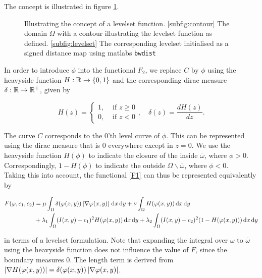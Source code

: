 The concept is illustrated in figure \ref{fig:levelsetconcept}.

\begin{figure}
  \centering
  \quad
  \caption{Illustrating the concept of a levelset function. \ref{subfig:contour} The domain $\Omega$ with a contour illustrating the levelset function as defined. \ref{subfig:levelset} The corresponding levelset initialised as a signed distance map using matlabs \texttt{bwdist}}\label{fig:levelsetconcept}
\end{figure}

In order to introduce $\phi$ into the functional $F_2$, we replace $C$ by $\phi$ using the heavyside function $H:\mathbb R \to \{0,1\}$ and the corresponding dirac measure $\delta:\mathbb R\to \mathbb R^+$, given by

\begin{equation}
  H(z) = \begin{cases}
    1,& \mbox{ if }  z \geq 0\\
    0,& \mbox{ if }  z < 0
  \end{cases}, \quad 
  \delta(z) = \frac{dH(z)}{dz}.
\end{equation}


The curve $C$ corresponds to the 0'th level curve of $\phi$. This can be represented using the dirac measure that is 0 everywhere except in $z=0$. We use the heavyside function $H(\phi)$ to indicate the closure of the inside $\overline{\omega}$, where $\phi > 0$. Correspondingly, $1-H(\phi)$ to indicate the outside $\Omega\backslash \overline{\omega}$, where $\phi < 0$.\\
Taking this into account, the functional \eqref{F1} can thus be represented equivalently by

\begin{align}
\begin{split}
  F(\phi,c_1,c_2) &= \mu \int_\Omega \delta(\phi(x,y))\abs{\nabla\phi(x,y)} \df x \df y + \nu \int_{\Omega} H(\phi(x,y)) \df x \df y\\
  &+ \lambda_1\int_{\Omega}(I(x,y)-c_1)^2H(\phi(x,y)) \df x \df y + \lambda_2\int_{\Omega} (I(x,y)-c_2)^2 (1-H(\phi(x,y)))\df x \df y\label{F2}
\end{split}
\end{align}

in terms of a levelset formulation. Note that expanding the integral over $\omega$ to $\overline{\omega}$ using the heavyside function does not influence the value of $F$, since the boundary measures 0. The length term is derived from $\left| {\nabla H(\varphi(x,y))} \right| = \delta(\varphi(x,y))\left| {\nabla \varphi(x,y)} \right|$.

